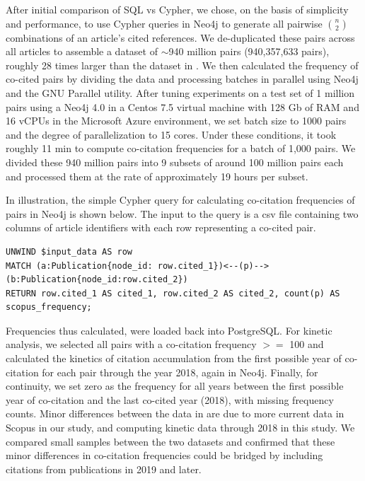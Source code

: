 \documentclass[utf8]{frontiersSCNS}
\begin{document}
After initial comparison of SQL vs Cypher, we chose, on the basis of simplicity and performance, to use Cypher queries in Neo4j to generate all pairwise $n\choose 2$ combinations of an article's cited references. We de-duplicated these pairs across all articles to assemble a dataset of $\sim$940 million pairs (940,357,633 pairs), roughly 28 times larger than the dataset in \cite{devarakonda_2020}. We then calculated the frequency of co-cited pairs by dividing the data and processing batches in parallel using Neo4j and the GNU Parallel utility.  After tuning experiments on a test set of 1 million pairs using a Neo4j 4.0 in a Centos 7.5 virtual machine with 128 Gb of RAM and 16 vCPUs in the Microsoft Azure environment, we set batch size to 1000 pairs and the degree of parallelization to 15 cores. Under these conditions, it took roughly 11 min to compute co-citation frequencies for a batch of 1,000 pairs. We divided these 940 million pairs into 9 subsets of around 100 million pairs each and processed them at the rate of approximately 19 hours per subset.  

In illustration, the simple Cypher query for calculating co-citation frequencies of pairs in Neo4j is shown below. The input to the query is a csv file containing two columns of article identifiers with each row representing a co-cited pair.  
\vspace{2 mm}
\lstset{language=Pascal, basicstyle=\footnotesize} 
\begin{lstlisting}[frame=single]
UNWIND $input_data AS row
MATCH (a:Publication{node_id: row.cited_1})<--(p)-->(b:Publication{node_id:row.cited_2})
RETURN row.cited_1 AS cited_1, row.cited_2 AS cited_2, count(p) AS scopus_frequency;
\end{lstlisting}

Frequencies thus calculated, were loaded back into PostgreSQL. For kinetic analysis, we selected all pairs with a co-citation frequency $>=$ 100 and calculated the kinetics of citation accumulation from the first possible year of co-citation for each pair through the year 2018, again in Neo4j.  Finally, for continuity, we set zero as the frequency for all years between the first possible year of co-citation and the last co-cited year (2018), with  missing frequency counts. Minor differences between the data in  \cite{devarakonda_2020} are due to more current data in Scopus in our study, and computing kinetic data through 2018 in this study. We compared small samples between the two datasets and confirmed that these minor differences in co-citation frequencies could be bridged by including citations from publications in 2019 and later. 
\end{document}
